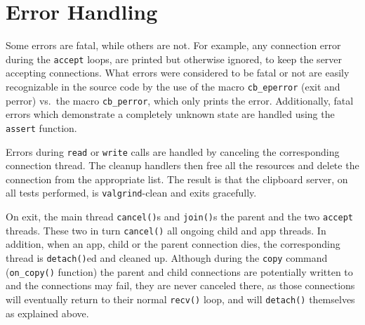 \documentclass[a4paper, titlepage, english]{article}
\begin{document}
\section{Error Handling}
\par
Some errors are fatal, while others are not. For example, any connection error during the \texttt{accept} loops, are printed but otherwise ignored, to keep the server accepting connections. What errors were considered to be fatal or not are easily recognizable in the source code by the use of the macro \texttt{cb\_eperror} (exit and perror) vs.\ the macro \texttt{cb\_perror}, which only prints the error. Additionally, fatal errors which demonstrate a completely unknown state are handled using the \texttt{assert} function.
\par
Errors during \texttt{read} or \texttt{write} calls are handled by canceling the corresponding connection thread. The cleanup handlers then free all the resources and delete the connection from the appropriate list. The result is that the clipboard server, on all tests performed, is \texttt{valgrind}-clean and exits gracefully.
\par
On exit, the main thread \texttt{cancel()}s and \texttt{join()}s the parent and the two \texttt{accept} threads. These two in turn \texttt{cancel()} all ongoing child and app threads. In addition, when an app, child or the parent connection dies, the corresponding thread is \texttt{detach()}ed and cleaned up. Although during the \texttt{copy} command (\texttt{on\_copy()} function) the parent and child connections are potentially written to and the connections may fail, they are never canceled there, as those connections will eventually return to their normal \texttt{recv()} loop, and will \texttt{detach()} themselves as explained above.



\end{document}
